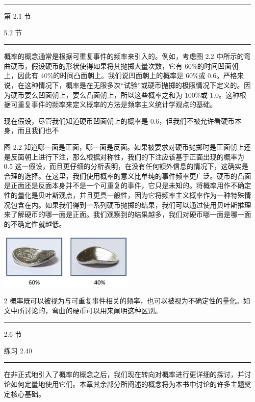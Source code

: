 \documentclass[10pt]{article}
\newcommand{\HRule}{\begin{center}\rule{0.9\linewidth}{0.2mm}\end{center}}
\begin{document}
\HRule

第 2.1 节

5.2 节

\HRule

概率的概念通常是根据可重复事件的频率来引入的。例如，考虑图 2.2 中所示的弯曲硬币，假设硬币的形状使得如果将其抛掷大量次数，它有 60\%的时间凹面朝上，因此有 40\%的时间凸面朝上。我们说凹面朝上的概率是 60\%或 0.6。严格来说，在这种情况下，概率是在无限多次“试验”或硬币抛掷的极限情况下定义的。因为硬币要么凹面朝上，要么凸面朝上，所以这些概率之和为 100\%或 1.0。这种根据可重复事件的频率来定义概率的方法是频率主义统计学观点的基础。

现在假设，尽管我们知道硬币凹面朝上的概率是 0.6，但我们不被允许看硬币本身，而且我们也不

图 2.2 知道哪一面是正面，哪一面是反面。如果被要求对硬币抛掷时是正面朝上还是反面朝上进行下注，那么根据对称性，我们的下注应该基于正面出现的概率为 0.5 这一假设，而且更仔细的分析表明，在没有任何额外信息的情况下，这确实是合理的选择。在这里，我们使用概率的意义比单纯的事件频率更广泛。硬币的凸面是正面还是反面本身并不是一个可重复的事件，它只是未知的。将概率用作不确定性的量化是贝叶斯观点，并且更具一般性，因为它将频率主义概率作为一种特殊情况包含在内。如果我们得到一系列硬币抛掷的结果，我们可以通过使用贝叶斯推理来了解硬币的哪一面是正面。我们观察到的结果越多，我们对硬币哪一面是哪一面的不确定性就越低。

\begin{center}
\includegraphics[max width=0.5\textwidth]{images/0194e279-9b28-703a-88f4-c3ac21e2010d_44_902_348_646_267_0.jpg}
\end{center}
\hspace*{3em} 

2 概率既可以被视为与可重复事件相关的频率，也可以被视为不确定性的量化。如文中所讨论的，弯曲的硬币可以用来阐明这种区别。

\HRule

2.6 节

练习 2.40

\HRule

在非正式地引入了概率的概念之后，我们现在转向对概率进行更详细的探讨，并讨论如何定量地使用它们。本章其余部分所阐述的概念将为本书中讨论的许多主题奠定核心基础。
\end{document}
